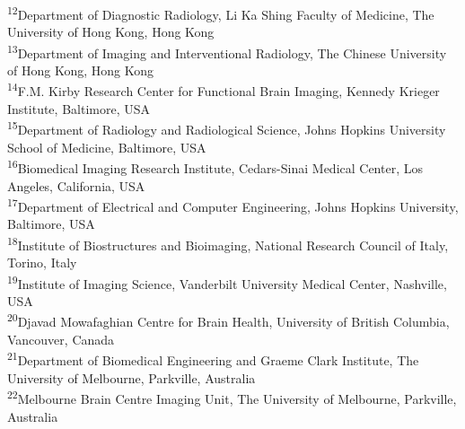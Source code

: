 \documentclass[11pt,a4paper]{article}
\newcommand{\affil}[1]{\textsuperscript{#1}}
\begin{document}
{{\small \affil{12}Department of Diagnostic Radiology, Li Ka Shing Faculty of Medicine, The University of Hong Kong, Hong Kong\\
\small \affil{13}Department of Imaging and Interventional Radiology, The Chinese University of Hong Kong, Hong Kong\\
\small \affil{14}F.M. Kirby Research Center for Functional Brain Imaging, Kennedy Krieger Institute, Baltimore, USA\\
\small \affil{15}Department of Radiology and Radiological Science, Johns Hopkins University School of Medicine, Baltimore, USA\\
\small \affil{16}Biomedical Imaging Research Institute, Cedars-Sinai Medical Center, Los Angeles, California, USA\\
\small \affil{17}Department of Electrical and Computer Engineering, Johns Hopkins University, Baltimore, USA\\
\small \affil{18}Institute of Biostructures and Bioimaging, National Research Council of Italy, Torino, Italy\\
\small \affil{19}Institute of Imaging Science, Vanderbilt University Medical Center, Nashville, USA\\
\small \affil{20}Djavad Mowafaghian Centre for Brain Health, University of British Columbia, Vancouver, Canada\\
\small \affil{21}Department of Biomedical Engineering and Graeme Clark Institute, The University of Melbourne, Parkville, Australia\\
\small \affil{22}Melbourne Brain Centre Imaging Unit, The University of Melbourne, Parkville, Australia
}}

\date{\today}

\maketitle
\end{document}
